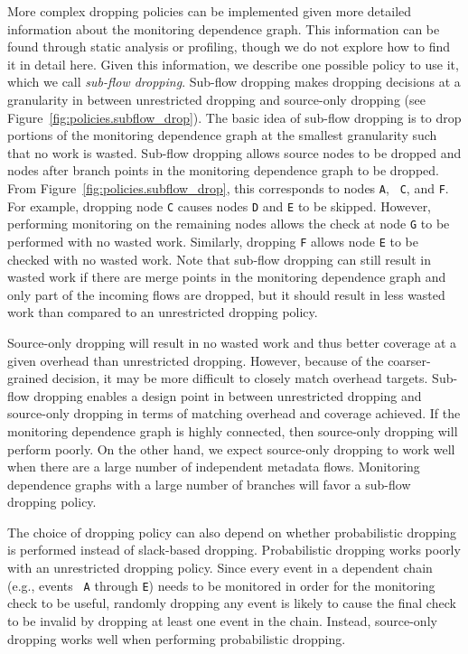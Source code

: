 More complex dropping policies can be implemented given more detailed
information about the monitoring dependence graph. This information can be
found through static analysis or profiling, though we do not explore how to
find it in detail here. Given this information, we describe one possible
policy to use it, which we call \emph{sub-flow dropping}. Sub-flow dropping makes
dropping decisions at a granularity in between unrestricted dropping and
source-only dropping (see Figure~\ref{fig:policies.subflow_drop}). 
The basic idea of sub-flow dropping is to drop portions of the monitoring
dependence graph at the smallest granularity such that no work is wasted.
Sub-flow dropping allows source nodes to be dropped and nodes after branch
points in the monitoring dependence graph to be dropped. From
Figure~\ref{fig:policies.subflow_drop}, this corresponds to nodes {\tt A}, {\tt
C}, and {\tt F}. For example,
dropping node {\tt C} causes nodes {\tt D} and {\tt E} to be skipped. However,
performing monitoring on the remaining nodes allows the check at node {\tt G}
to be performed with no wasted work. Similarly, dropping {\tt F} allows node
{\tt E} to be checked with no wasted work.
Note that sub-flow dropping can still result in wasted work if there are merge
points in the monitoring dependence graph and only part of the incoming flows
are dropped, but it should result in less wasted work than compared to an
unrestricted dropping policy. 

Source-only dropping will
result in no wasted work and thus better coverage at a given overhead than
unrestricted dropping. However, because of the coarser-grained decision, it
may be more difficult to closely match overhead targets. 
Sub-flow dropping enables a design point in between unrestricted dropping and
source-only dropping in terms of matching overhead and coverage achieved.
If the monitoring dependence graph is highly connected, then source-only
dropping will perform poorly. On the other hand, we expect source-only dropping 
to work well when there are a large number of independent metadata flows.
Monitoring dependence graphs with a large number of branches will favor a
sub-flow dropping policy.

The choice of dropping policy can also depend on whether probabilistic dropping
is performed instead of slack-based dropping.
Probabilistic dropping works poorly with an
unrestricted dropping policy. Since every event in a dependent chain (e.g., events {\tt
A} through {\tt E}) needs to be monitored in order for the monitoring check to
be useful, randomly dropping any event is likely to cause the final check to be
invalid by dropping at least one event in the chain. Instead, source-only
dropping works well when performing probabilistic dropping.

